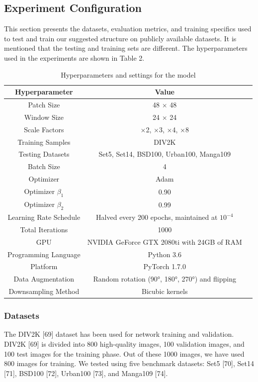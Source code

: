 \documentclass[twocolumn]{svjour3}          %
\begin{document}
\subsection{Experiment Configuration}
This section presents the datasets, evaluation metrics, and training specifics used to test and train our suggested structure on publicly available datasets. It is mentioned that the testing and training sets are different. The hyperparameters used in the experiments are shown in Table 2.

\begin{table}
\centering
\caption{Hyperparameters and settings for the model}
\label{table:hyperparameters}
\setlength{\tabcolsep}{2 pt}
\begin{tabular}{|c|c|c|}
\hline
\textbf{Hyperparameter} & \textbf{Value} \\
\hline
Patch Size & 48 $\times$ 48 \\
Window Size & 24 $\times$ 24 \\
Scale Factors & $\times$2, $\times$3, $\times$4, $\times$8 \\
Training Samples & DIV2K \\
Testing Datasets & Set5, Set14, BSD100, Urban100, Manga109 \\
Batch Size & 4 \\
Optimizer & Adam \\
Optimizer $\beta_1$ & 0.90 \\
Optimizer $\beta_2$ & 0.99 \\
Learning Rate Schedule & Halved every 200 epochs, maintained at $10^{-4}$ \\
Total Iterations & 1000 \\
GPU & NVIDIA GeForce GTX 2080ti with 24GB of RAM \\
Programming Language & Python 3.6 \\
Platform & PyTorch 1.7.0 \\
Data Augmentation & Random rotation (90°, 180°, 270°) and flipping \\
Downsampling Method & Bicubic kernels \\
\hline
\end{tabular}

\end{table}


\subsubsection{Datasets} 
The DIV2K [69] dataset has been used for network training and validation. DIV2K [69] is divided into 800 high-quality images, 100 validation images, and 100 test images for the training phase. Out of these 1000 images, we have used 800 images for training. We tested using five benchmark datasets: Set5 [70], Set14 [71], BSD100 [72], Urban100 [73], and Manga109 [74].
\end{document}
